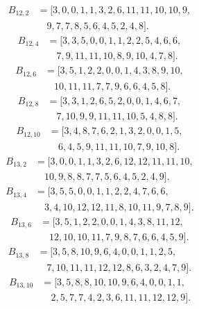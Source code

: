 \documentclass[11pt,a4paper]{article}
\theoremstyle{definition}\newtheorem{definition}[theorem]{Definition}
\theoremstyle{remark}\newtheorem{remark}[theorem]{Remark}
\begin{document}
\[\begin{aligned}
B_{12,2}&=[3,0,0,1,1,3,2,6,11,11,10,10,9,\\
&\quad 9,7,7,8,5,6,4,5,2,4,8].
\end{aligned}\]
\[\begin{aligned}
B_{12,4}&=[3,3,5,0,0,1,1,2,2,5,4,6,6,\\
&\quad 7,9,11,11,10,8,9,10,4,7,8].
\end{aligned}\]
\[\begin{aligned}
B_{12,6}&=[3,5,1,2,2,0,0,1,4,3,8,9,10,\\
&\quad 10,11,11,7,7,9,6,6,4,5,8].
\end{aligned}\]
\[\begin{aligned}
B_{12,8}&=[3,3,1,2,6,5,2,0,0,1,4,6,7,\\
&\quad 7,10,9,9,11,11,10,5,4,8,8].
\end{aligned}\]
\[\begin{aligned}
B_{12,10}&=[3,4,8,7,6,2,1,3,2,0,0,1,5,\\
&\quad 6,4,5,9,11,11,10,7,9,10,8].
\end{aligned}\]
\[\begin{aligned}
B_{13,2}&=[3,0,0,1,1,3,2,6,12,12,11,11,10,\\
&\quad 10,9,8,8,7,7,5,6,4,5,2,4,9].
\end{aligned}\]
\[\begin{aligned}
B_{13,4}&=[3,5,5,0,0,1,1,2,2,4,7,6,6,\\
&\quad 3,4,10,12,12,11,8,10,11,9,7,8,9].
\end{aligned}\]
\[\begin{aligned}
B_{13,6}&=[3,5,1,2,2,0,0,1,4,3,8,11,12,\\
&\quad 12,10,10,11,7,9,8,7,6,6,4,5,9].
\end{aligned}\]
\[\begin{aligned}
B_{13,8}&=[3,5,8,10,9,6,4,0,0,1,1,2,5,\\
&\quad 7,10,11,11,12,12,8,6,3,2,4,7,9].
\end{aligned}\]
\[\begin{aligned}
B_{13,10}&=[3,5,8,8,10,10,9,6,4,0,0,1,1,\\
&\quad 2,5,7,7,4,2,3,6,11,11,12,12,9].
\end{aligned}\]
\end{document}
